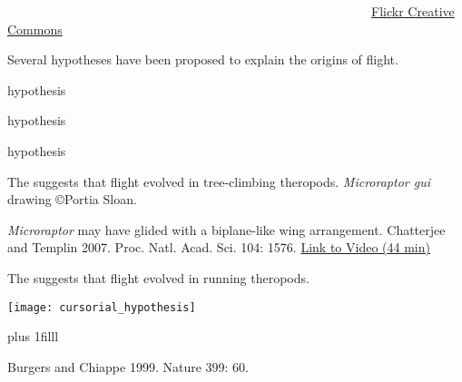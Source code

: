 \documentclass[t]{beamer}
\begin{document}
%
{
\begin{frame}[b,plain]{\textcolor{white}{How did flight evolve?}}
\tiny \hfill \textcolor{white}{American White Pelicans by DennyMont, \href{https://www.flickr.com/photos/92766247@N00/2537201735}{Flickr Creative Commons}, .}

\end{frame}
}
%

\begin{frame}[t,plain]{Several hypotheses have been proposed to explain the origins of flight.}

	
	\hangpara {} hypothesis
	
	\vspace{1em}
	
	\hangpara {} hypothesis

	\vspace{1em}
	
	\hangpara {} hypothesis
\end{frame}

{
\begin{frame}[b,plain]{The  suggests that flight evolved in tree-climbing theropods.}
\tiny\hfill\textit{Microraptor gui} drawing \copyright Portia Sloan.
\end{frame}
}

{
\begin{frame}[b,plain]{\textit{Microraptor} may have glided with a biplane-like wing arrangement.}
    \tiny Chatterjee and Templin 2007. Proc. Natl. Acad. Sci. 104: 1576. \hfill\href{https://www.youtube.com/watch?v=yL0UIzU0EEc}{Link to Video (44 min)}
\end{frame}
}

\begin{frame}[t,plain]{The  suggests that flight evolved in running theropods.}
	\begin{center}
		\texttt{[image: cursorial\_hypothesis]}
	\end{center}

	\vskip0pt plus 1filll
	
	\tiny	Burgers and Chiappe 1999. Nature 399: 60.
\end{frame}
\end{document}
